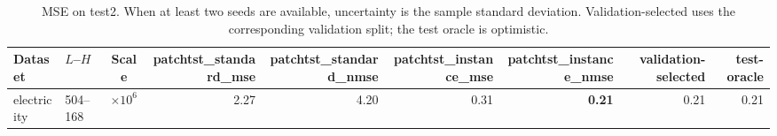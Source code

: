\begin{table}[htbp]
\centering
\caption{MSE on test2. When at least two seeds are available, uncertainty is the sample standard deviation. Validation-selected uses the corresponding validation split; the test oracle is optimistic.}
\begin{tabular}{llcrrrrr|r}
\toprule
Dataset & $L$--$H$ & Scale & patchtst\_standard\_mse & patchtst\_standard\_nmse & patchtst\_instance\_mse & patchtst\_instance\_nmse & validation-selected & test-oracle \\
\midrule
electricity & 504--168 & $\times 10^{6}$ & 2.27 & 4.20 & 0.31 & \textbf{0.21} & 0.21 & 0.21 \\
\bottomrule
\end{tabular}
\end{table}
